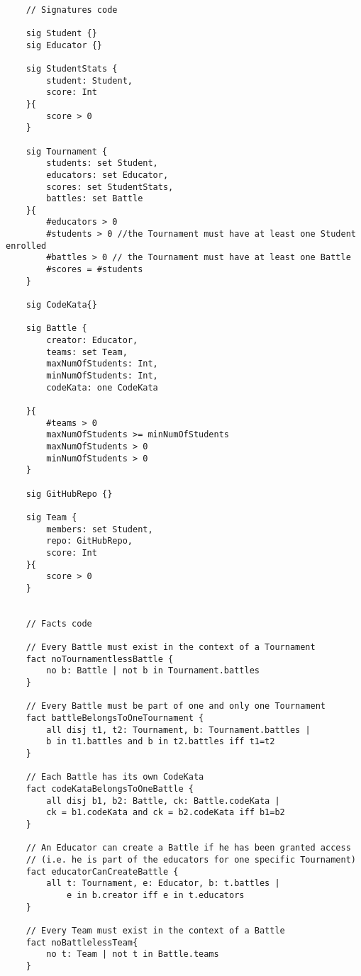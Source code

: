 \documentclass[a4paper, 11pt, titlepage]{article}
\begin{document}
\begin{lstlisting}[style=alloyStyle]
    
    // Signatures code

    sig Student {}
    sig Educator {}

    sig StudentStats {
    	student: Student,
    	score: Int
    }{
    	score > 0
    }

    sig Tournament {
    	students: set Student,
    	educators: set Educator,
    	scores: set StudentStats,
    	battles: set Battle
    }{
    	#educators > 0
    	#students > 0 //the Tournament must have at least one Student enrolled
    	#battles > 0 // the Tournament must have at least one Battle
    	#scores = #students
    }

    sig CodeKata{}

    sig Battle {
    	creator: Educator,
    	teams: set Team,
    	maxNumOfStudents: Int,
    	minNumOfStudents: Int,
    	codeKata: one CodeKata	

    }{
    	#teams > 0
    	maxNumOfStudents >= minNumOfStudents
    	maxNumOfStudents > 0
    	minNumOfStudents > 0
    }

    sig GitHubRepo {}

    sig Team {
    	members: set Student,
    	repo: GitHubRepo,
    	score: Int
    }{
    	score > 0
    } 


    // Facts code 

    // Every Battle must exist in the context of a Tournament
    fact noTournamentlessBattle {
    	no b: Battle | not b in Tournament.battles
    }

    // Every Battle must be part of one and only one Tournament
    fact battleBelongsToOneTournament {
    	all disj t1, t2: Tournament, b: Tournament.battles |
    	b in t1.battles and b in t2.battles iff t1=t2
    }

    // Each Battle has its own CodeKata
    fact codeKataBelongsToOneBattle {
    	all disj b1, b2: Battle, ck: Battle.codeKata |
    	ck = b1.codeKata and ck = b2.codeKata iff b1=b2
    }

    // An Educator can create a Battle if he has been granted access 
    // (i.e. he is part of the educators for one specific Tournament)
    fact educatorCanCreateBattle {
    	all t: Tournament, e: Educator, b: t.battles |
    		e in b.creator iff e in t.educators
    }

    // Every Team must exist in the context of a Battle
    fact noBattlelessTeam{
    	no t: Team | not t in Battle.teams
    }


\end{lstlisting}
\end{document}

